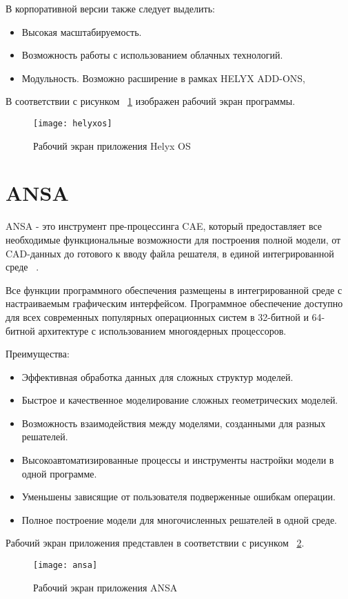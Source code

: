 \documentclass[14pt]{extreport}
\begin{document}
В корпоративной версии также следует выделить:
\begin{itemize}
\item Высокая масштабируемость.
\item Возможность работы с использованием облачных технологий.
\item Модульность. Возможно расширение в рамках HELYX ADD-ONS, 
\end{itemize}

В соответствии с рисунком ~\ref{fig2} изображен рабочий экран программы.

\begin{figure}[H]
\centerline{\texttt{[image: helyxos]}}
\caption{Рабочий экран приложения Helyx OS}
\label{fig2}
\end{figure}

\section{ANSA}
ANSA - это инструмент пре-процессинга CAE, который предоставляет все необходимые функциональные возможности для построения полной модели, от CAD-данных  до готового к вводу файла решателя, в единой интегрированной среде ~\cite{Ansa}.

Все функции программного обеспечения размещены в интегрированной среде с настраиваемым графическим интерфейсом. Программное обеспечение доступно для всех современных популярных операционных систем в 32-битной и 64-битной архитектуре с использованием многоядерных процессоров. 

Преимущества: 
\begin{itemize}
\item Эффективная обработка данных для сложных структур моделей.
\item Быстрое и качественное моделирование сложных геометрических моделей.
\item Возможность взаимодействия между моделями, созданными для разных решателей.
\item Высокоавтоматизированные процессы и инструменты настройки модели в одной программе.
\item Уменьшены зависящие от пользователя подверженные ошибкам операции.
\item Полное построение модели для многочисленных решателей в одной среде.
\end{itemize}
Рабочий экран приложения представлен в соответствии с рисунком ~\ref{fig3}.

\begin{figure}[H]
\centerline{\texttt{[image: ansa]}}
\caption{Рабочий экран приложения ANSA}
\label{fig3}
\end{figure}
\end{document}
